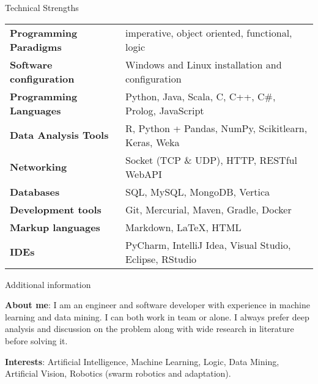 \documentclass{resume} %
\begin{document}
    
    \begin{rSection}{Technical Strengths}
        \begin{tabular}{ @{} >{\bfseries}l @{\hspace{6ex}} l }
            Programming Paradigms	& imperative, object oriented, functional, logic\\
            Software configuration 	& Windows and Linux installation and configuration\\
            Programming Languages 	& Python, Java, Scala, C, C++, C\#, Prolog, JavaScript\\
            Data Analysis Tools		& R, Python + Pandas, NumPy, Scikitlearn, Keras, Weka\\
            Networking 				& Socket (TCP \& UDP), HTTP, RESTful WebAPI \\
            Databases 				& SQL, MySQL, MongoDB, Vertica \\
            Development tools 		& Git, Mercurial, Maven, Gradle, Docker \\
            Markup languages 		& Markdown, \LaTeX, HTML\\
            IDEs 					& PyCharm, IntelliJ Idea, Visual Studio, Eclipse, RStudio
        \end{tabular}						
    \end{rSection}
    
    
    
    \begin{rSection}{Additional information}
        
        \item \textbf{About me}: I am an engineer and software developer with experience in machine learning and data mining. I can both work in team or alone. I always prefer deep analysis and discussion on the problem along with wide research in literature before solving it.
        
        \item \textbf{Interests}: Artificial Intelligence, Machine Learning, Logic, Data Mining, Artificial Vision, Robotics (swarm robotics and adaptation).
        
    \end{rSection}
    
\end{document}

